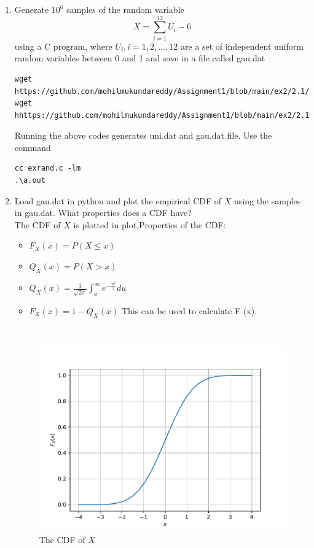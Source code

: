 \documentclass[journal,12pt,twocolumn]{IEEEtran}
\renewcommand\thesection{\arabic{section}}
\begin{document}
\begin{enumerate}[label=\thesection.\arabic*,ref=\thesection.\theenumi]

\item
Generate $10^6$ samples of the random variable
%
\begin{equation}
X = \sum_{i=1}^{12}U_i -6
\end{equation}
%
using a C program, where $U_i, i = 1,2,\dots, 12$ are  a set of independent uniform random variables between 0 and 1
and save in a file called gau.dat
\\
\solution
\begin{lstlisting}
wget https://github.com/mohilmukundareddy/Assignment1/blob/main/ex2/2.1/exrand.c
wget hhttps://github.com/mohilmukundareddy/Assignment1/blob/main/ex2/2.1/coeffs.h
\end{lstlisting}
Running the above codes generates uni.dat and gau.dat file.
Use the command 
\begin{lstlisting}
cc exrand.c -lm
.\a.out
\end{lstlisting}

\item
Load gau.dat in python and plot the empirical CDF of $X$ using the samples in gau.dat. What properties does a CDF have?
\\
\solution 
The CDF of $X$ is plotted in plot,Properties of the CDF:
\begin{itemize}
\item $F_X (x)=P(X \leq x) $
\item $Q_X (x) = P(X > x)$
\item $Q_X (x) =\frac{1}{\sqrt{2\pi}} \int_{x} ^{\infty} e^{-\frac{u^2}{2}} du$
\item  $F_X (x) = 1 - Q_X (x)$ This can be used to calculate F (x).
\end{itemize}
\\
\begin{figure}[H]
\centering
\includegraphics[width=\columnwidth]{gau_cdf.pdf}
\caption{The CDF of $X$}
\label{fig:gau_cdf}
\end{figure}
\\


\end{enumerate}
\end{document}
